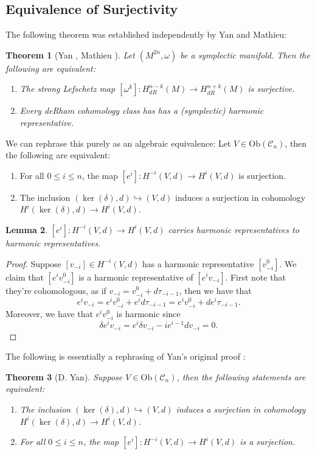 \documentclass{amsart}
\newcommand{\ra}{\rightarrow}
\newtheorem{theorem}{Theorem}
\newtheorem{lemma}[theorem]{Lemma}
\theoremstyle{definition}
\begin{document}
\subsection{Equivalence of Surjectivity}
The following theorem was established independently by Yan and Mathieu:
\begin{theorem}[Yan \cite{YAN1996143}, Mathieu \cite{Mathieu}]
    Let $(M^{2n},\omega)$ be a symplectic manifold. Then the following are equivalent:
    \begin{enumerate}
    \item The strong Lefschetz map $[\omega^k]:H^{n-k}_{dR}(M) \ra H^{n+k}_{dR}(M)$ is surjective.
    \item Every deRham cohomology class has has a (symplectic) harmonic representative.
\end{enumerate}
\end{theorem}
We can rephrase this purely as an algebraic equivalence: Let $V \in \mathrm{Ob}(\mathscr{C}_n)$, then the following are equivalent: 
\begin{enumerate}
        \item For all $0 \leq i \leq n$, the map $[e^i]:H^{-i}(V,d) \ra H^i(V,d)$ is surjection.
          \item The inclusion $(\ker(\delta),d) \hookrightarrow (V,d)$ induces a surjection in cohomology $H^i(\ker(\delta),d) \ra H^i(V,d)$.
    \end{enumerate}
\begin{lemma}\label{HarreptoHarrep}
    $[e^i]:H^{-i}(V,d) \ra H^i(V,d)$ carries harmonic representatives to harmonic representatives.
\end{lemma}
\begin{proof}
    Suppose $[v_{-i}] \in H^{-i}(V,d)$ has a harmonic representative $[v_{-i}^0]$. We claim that $[e^iv_{-i}^0]$ is a harmonic representative of $[e^iv_{-i}]$. First note that they're cohomologous, as if $v_{-i}=v_{-i}^0+d\tau_{-i-1}$, then we have that
    \begin{equation*}
        e^iv_{-i} = e^iv_{-i}^0 + e^id\tau_{-i-1} = e^iv_{-i}^0 + de^i\tau_{-i-1}.
    \end{equation*}
    Moreover, we have that $e^iv_{-i}^0$ is harmonic since
    \begin{equation*}
        \delta e^iv_{-i} = e^i \delta v_{-i} - ie^{i-1}dv_{-i} = 0.
    \end{equation*}
\end{proof}
The following is essentially a rephrasing of Yan's original proof \cite{YAN1996143}:
\begin{theorem}[D. Yan]\label{DoubleEquiv}
    Suppose $V \in \mathrm{Ob}(\mathscr{C}_n)$, then the following statements are equivalent:
    \begin{enumerate}
        \item The inclusion $(\ker(\delta),d) \hookrightarrow (V,d)$ induces a surjection in cohomology $H^i(\ker(\delta),d) \ra H^i(V,d)$.
        \item For all $0 \leq i \leq n$, the map $[e^i]:H^{-i}(V,d) \ra H^i(V,d)$ is a surjection.
    \end{enumerate}
\end{theorem}
\end{document}
